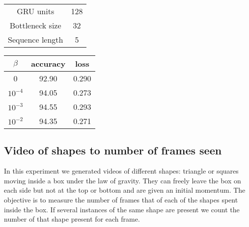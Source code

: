 \documentclass[11pt,oneside,openright]{report}
\begin{document}
\begin{minipage}{0.35\textwidth}
        \centering
\begin{tabular}{ c | c  }
 GRU units & 128 \\
 Bottleneck size & 32 \\
 Sequence length & 5 \\
\end{tabular}
    \end{minipage}\hfill
    \begin{minipage}{0.8\textwidth}
        \centering
\begin{tabular}{ c | c c }
 $\beta$ & accuracy & loss \\
 \hline
0 & 92.90 & 0.290 \\
$10^{-4}$ & 94.05 & 0.273 \\
$10^{-3}$ & 94.55 & 0.293 \\
$10^{-2}$ & 94.35 & 0.271 \\
\end{tabular}
    \end{minipage}

\begin{center}
\end{center}

\subsection{Video of shapes to number of frames seen}

In this experiment we generated videos of different shapes: triangle or squares moving inside a box under the law of gravity. They can freely leave the box on each side but not at the top or bottom and are given an initial momentum. The objective is to measure the number of frames that of each of the shapes spent inside the box. If several instances of the same shape are present we count the number of that shape present for each frame. 
\end{document}
